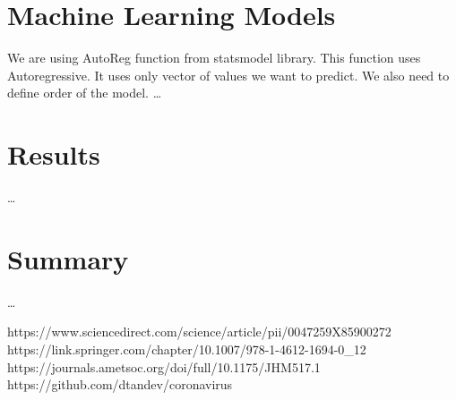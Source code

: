 \documentclass[conference]{IEEEtran}
\begin{document}
\section{Machine Learning Models}
We are using AutoReg function from statsmodel library. This function uses Autoregressive. It uses only vector of values we want to predict.
 We also need to define order of the model.
\dots

\section{Results}
\dots

\section{Summary}
\dots


\begin{thebibliography}{00}
 https://www.sciencedirect.com/science/article/pii/0047259X85900272
 https://link.springer.com/chapter/10.1007/978-1-4612-1694-0\_12
 https://journals.ametsoc.org/doi/full/10.1175/JHM517.1
 https://github.com/dtandev/coronavirus
\end{thebibliography}
\vspace{12pt}
\end{document}
